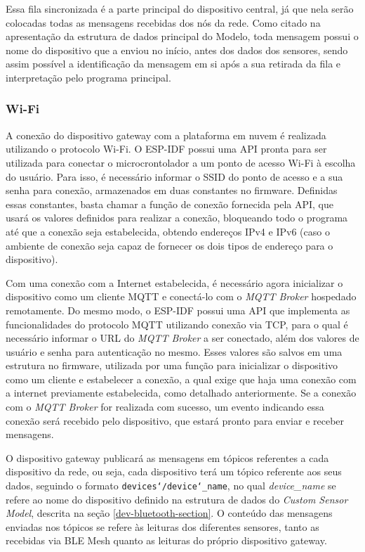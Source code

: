 \documentclass[../monografia.tex]{subfiles}
\begin{document}
Essa fila sincronizada é a parte principal do dispositivo central, já que nela serão colocadas todas as mensagens recebidas dos nós da rede. Como citado na apresentação da estrutura de dados principal do Modelo, toda mensagem possui o nome do dispositivo que a enviou no início, antes dos dados dos sensores, sendo assim possível a identificação da mensagem em si após a sua retirada da fila e interpretação pelo programa principal.


\subsubsection{Wi-Fi} \label{dev-Wi-Fi}

A conexão do dispositivo gateway com a plataforma em nuvem é realizada utilizando o protocolo Wi-Fi. O ESP-IDF possui uma API pronta para ser utilizada para conectar o microcrontolador a um ponto de acesso Wi-Fi à escolha do usuário. Para isso, é necessário informar o SSID do ponto de acesso e a sua senha para conexão, armazenados em duas constantes no firmware. Definidas essas constantes, basta chamar a função de conexão fornecida pela API, que usará os valores definidos para realizar a conexão, bloqueando todo o programa até que a conexão seja estabelecida, obtendo endereços IPv4 e IPv6 (caso o ambiente de conexão seja capaz de fornecer os dois tipos de endereço para o dispositivo).

Com uma conexão com a Internet estabelecida, é necessário agora inicializar o dispositivo como um cliente MQTT e conectá-lo com o \textit{MQTT Broker} hospedado remotamente. Do mesmo modo, o ESP-IDF possui uma API que implementa as funcionalidades do protocolo MQTT utilizando conexão via TCP, para o qual é necessário informar o URL do \textit{MQTT Broker} a ser conectado, além dos valores de usuário e senha para autenticação no mesmo. Esses valores são salvos em uma estrutura no firmware, utilizada por uma função para inicializar o dispositivo como um cliente e estabelecer a conexão, a qual exige que haja uma conexão com a internet previamente estabelecida, como detalhado anteriormente. Se a conexão com o \textit{MQTT Broker} for realizada com sucesso, um evento indicando essa conexão será recebido pelo dispositivo, que estará pronto para enviar e receber mensagens.

O dispositivo gateway publicará as mensagens em tópicos referentes a cada dispositivo da rede, ou seja, cada dispositivo terá um tópico referente aos seus dados, seguindo o formato \texttt{devices\char`/device\char`_name}, no qual \textit{device\_name} se refere ao nome do dispositivo definido na estrutura de dados do \textit{Custom Sensor Model}, descrita na seção \ref{dev-bluetooth-section}. O conteúdo das mensagens enviadas nos tópicos se refere às leituras dos diferentes sensores, tanto as recebidas via BLE Mesh quanto as leituras do próprio dispositivo gateway.
\end{document}

